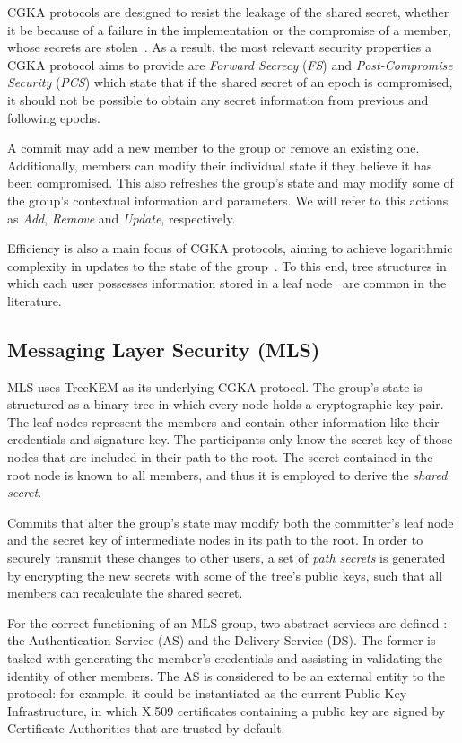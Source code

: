 \documentclass[preprint, 12pt]{elsarticle}
\begin{document}
CGKA protocols are designed to resist the leakage of the shared secret, whether it be because of a failure in the implementation or the compromise of a member, whose secrets are stolen~\cite{itk}. As a result, the most relevant security properties a CGKA protocol aims to provide are \textit{Forward Secrecy} (\textit{FS}) and \textit{Post-Compromise Security} (\textit{PCS}) which state that if the shared secret of an epoch is compromised, it should not be possible to obtain any secret information from previous and following epochs.

A commit may add a new member to the group or remove an existing one. Additionally, members can modify their individual state if they believe it has been compromised. This also refreshes the group's state and may modify some of the group's contextual information and parameters. We will refer to this actions as \textit{Add}, \textit{Remove} and \textit{Update}, respectively.

Efficiency is also a main focus of CGKA protocols, aiming to achieve logarithmic complexity in updates to the state of the group~\cite{bounds}. To this end, tree structures in which each user possesses information stored in a leaf node~\cite{art,treekem} are common in the literature. 

\subsection{Messaging Layer Security (MLS)}

MLS uses TreeKEM \cite{treekem} as its underlying CGKA protocol. The group's state is structured as a binary tree in which every node holds a cryptographic key pair. The leaf nodes represent the members and contain other information like their credentials and signature key. The participants only know the secret key of those nodes that are included in their path to the root. The secret contained in the root node is known to all members, and thus it is employed to derive the \textit{shared secret}.

Commits that alter the group's state may modify both the committer's leaf node and the secret key of intermediate nodes in its path to the root. In order to securely transmit these changes to other users, a set of \textit{path secrets} is generated by encrypting the new secrets with some of the tree's public keys, such that all members can recalculate the shared secret.

For the correct functioning of an MLS group, two abstract services are defined \cite{mls_arch}: the Authentication Service (AS) and the Delivery Service (DS). The former is tasked with generating the member's credentials and assisting in validating the identity of other members.  The AS is considered to be an external entity to the protocol: for example, it could be instantiated as the current Public Key Infrastructure, in which X.509 certificates containing a public key are signed by Certificate Authorities that are trusted by default.
\end{document}
